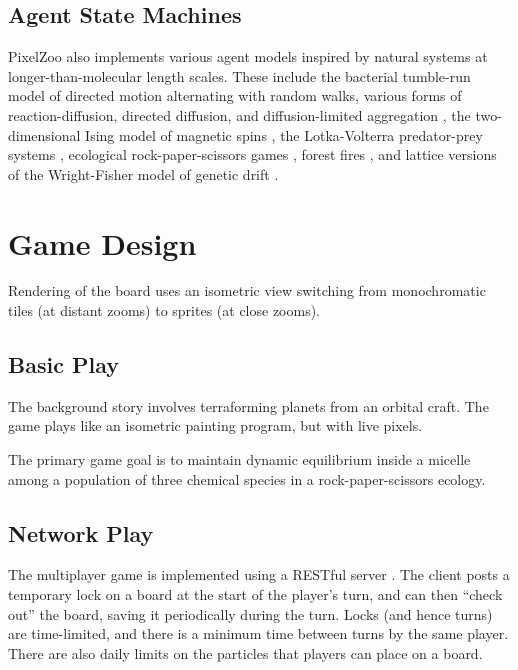 \documentclass{acm_proc_article-sp}
\begin{document}
\subsection{Agent State Machines}
\label{sec:AgentStateMachines}

PixelZoo also implements various agent models inspired by natural systems at longer-than-molecular length scales.
These include the bacterial tumble-run model of directed motion alternating with random walks\cite{RosserEtAl2013},
various forms of reaction-diffusion, directed diffusion, and diffusion-limited aggregation \cite{DLA},
the two-dimensional Ising model of magnetic spins \cite{Onsager1944},
the Lotka-Volterra predator-prey systems \cite{Lotka1910,Hirota199739},
ecological rock-paper-scissors games \cite{Tainaka2000},
forest fires \cite{Karafyllidis1997},
and lattice versions of the Wright-Fisher model of genetic drift \cite{MathiesonMcVean2013}.



\section{Game Design}

Rendering of the board uses an isometric view switching from monochromatic tiles (at distant zooms)
to sprites (at close zooms).

\subsection{Basic Play}

The background story involves terraforming planets from an orbital craft.
The game plays like an isometric painting program, but with live pixels.

The primary game goal is to maintain dynamic equilibrium inside a micelle
among a population of three chemical species in a rock-paper-scissors ecology.

\subsection{Network Play}

The multiplayer game is implemented using a RESTful server \cite{rest}.
The client posts a temporary lock on a board at the start of the player's turn,
and can then ``check out'' the board, saving it periodically during the turn.
Locks (and hence turns) are time-limited, and there is a minimum time between turns by the same player.
There are also daily limits on the particles that players can place on a board.
\end{document}
